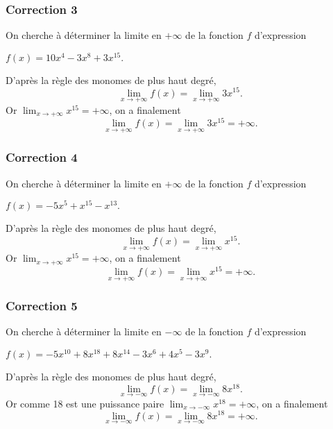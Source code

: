 \documentclass[15pt, mathserif]{beamer}
\begin{document}
\begin{frame}
\vspace{-10mm}
	\frametitle{Correction 3}
On cherche à déterminer la limite en $+\infty$ de la fonction $f$ d'expression 

\hfil $f(x)=10x^{4}-3x^{8}+3x^{15}.$


D'après la règle des monomes de plus haut degré, \[ \lim_{x \rightarrow +\infty} f(x) = \lim_{x \rightarrow +\infty}3x^{15}.\]Or $\displaystyle\lim_{x \rightarrow +\infty}x^{15} = +\infty$, on a finalement \[ \lim_{x \rightarrow +\infty} f(x) = \lim_{x \rightarrow +\infty}3x^{15} = +\infty.\]\end{frame}


\begin{frame}
\vspace{-10mm}
	\frametitle{Correction 4}
On cherche à déterminer la limite en $+\infty$ de la fonction $f$ d'expression 

\hfil $f(x)=-5x^{5}+x^{15}-x^{13}.$


D'après la règle des monomes de plus haut degré, \[ \lim_{x \rightarrow +\infty} f(x) = \lim_{x \rightarrow +\infty}x^{15}.\]Or $\displaystyle\lim_{x \rightarrow +\infty}x^{15} = +\infty$, on a finalement \[ \lim_{x \rightarrow +\infty} f(x) = \lim_{x \rightarrow +\infty}x^{15} = +\infty.\]\end{frame}


\begin{frame}
\vspace{-10mm}
	\frametitle{Correction 5}
On cherche à déterminer la limite en $-\infty$ de la fonction $f$ d'expression 

\hfil $f(x)=-5x^{10}+8x^{18}+8x^{14}-3x^{6}+4x^{5}-3x^{9}.$


D'après la règle des monomes de plus haut degré, \[ \lim_{x \rightarrow -\infty} f(x) = \lim_{x \rightarrow -\infty}8x^{18}.\]Or comme 18 est une puissance paire $\displaystyle\lim_{x \rightarrow -\infty}x^{18} = +\infty$, on a finalement \[ \lim_{x \rightarrow -\infty} f(x) = \lim_{x \rightarrow -\infty}8x^{18} = +\infty.\]\end{frame}
\end{document}
